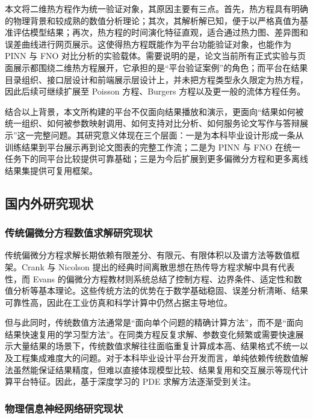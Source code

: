 \documentclass[UTF8,zihao=-4]{oucart}
\begin{document}
本文将二维热方程作为统一验证对象，其原因主要有三点。首先，热方程具有明确的物理背景和较成熟的数值分析理论；其次，其解析解已知，便于以严格真值为基准评估模型结果；再次，热方程的时间演化特征直观，适合通过热力图、差异图和误差曲线进行网页展示。这使得热方程既能作为平台功能验证对象，也能作为 PINN 与 FNO 对比分析的实验载体。需要说明的是，论文当前所有正式实验与页面展示都围绕二维热方程展开，它承担的是“平台验证案例”的角色；而平台在结果目录组织、接口层设计和前端展示层设计上，并未把方程类型永久限定为热方程，因此后续可继续扩展至 Poisson 方程、Burgers 方程以及更一般的流体方程任务。

结合以上背景，本文所构建的平台不仅面向结果播放和演示，更面向“结果如何被统一组织、如何被参数映射调用、如何支持对比分析、如何服务论文写作与答辩展示”这一完整问题。其研究意义体现在三个层面：一是为本科毕业设计形成一条从训练结果到平台展示再到论文图表的完整工作流；二是为 PINN 与 FNO 在统一任务下的同平台比较提供可靠基础；三是为今后扩展到更多偏微分方程和更多离线结果集提供可复用框架。

\subsection{国内外研究现状}

\subsubsection{传统偏微分方程数值求解研究现状}

传统偏微分方程求解长期依赖有限差分、有限元、有限体积以及谱方法等数值框架。Crank 与 Nicolson 提出的经典时间离散思想在热传导方程求解中具有代表性\cite{crank1947}，而 Evans 的偏微分方程教材则系统总结了控制方程、边界条件、适定性和数值分析等基本理论\cite{evans2010}。这些传统方法的优势在于数学基础稳固、误差分析清晰、结果可靠性高，因此在工业仿真和科学计算中仍然占据主导地位。

但与此同时，传统数值方法通常是“面向单个问题的精确计算方法”，而不是“面向结果快速复用的学习型方法”。在同类方程反复求解、参数变化频繁或需要快速展示大量结果的场景下，传统数值求解往往面临重复计算成本高、结果格式不统一以及工程集成难度大的问题。对于本科毕业设计平台开发而言，单纯依赖传统数值解法虽然能保证结果精度，但难以直接体现模型比较、结果复用和交互展示等现代计算平台特征。因此，基于深度学习的 PDE 求解方法逐渐受到关注。

\subsubsection{物理信息神经网络研究现状}
\end{document}
